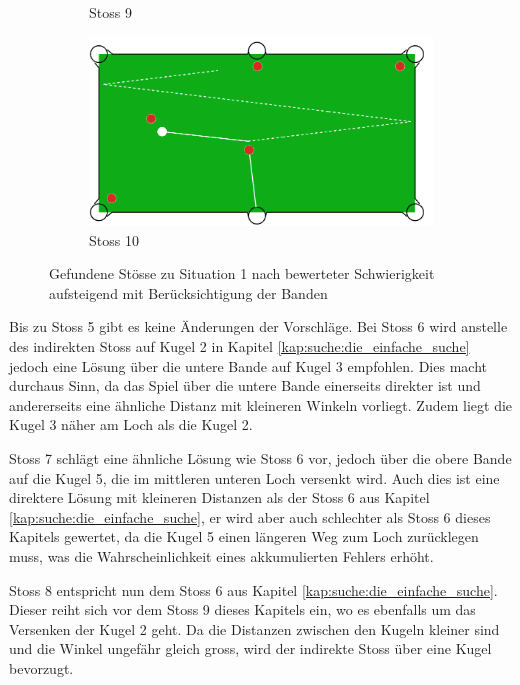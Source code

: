 \begin{figure}[h!]
\begin{subfigure}[b]{0.3\textwidth}
        \caption{Stoss 9}
        \label{fig:situation_rail_1_solution_9}
    \end{subfigure}
    \hfill
    \begin{subfigure}[b]{0.3\textwidth}
        \centering
        \includegraphics[width=1.0\linewidth]{../common/04_results/resources/simple_search/situation_diverse_solution_rail_10.PNG}
        \caption{Stoss 10}
        \label{fig:situation_rail_1_solution_10}
    \end{subfigure}
    \caption{Gefundene Stösse zu Situation 1 nach bewerteter Schwierigkeit aufsteigend mit Berücksichtigung der Banden}
    \label{fig:situation_1_solutions_bande}
\end{figure}

Bis zu Stoss 5 gibt es keine Änderungen der Vorschläge. Bei Stoss 6 wird
anstelle des indirekten Stoss auf Kugel 2 in Kapitel \ref{kap:suche:die_einfache_suche} jedoch eine Lösung über
die untere Bande auf Kugel 3 empfohlen. Dies macht durchaus Sinn, da das Spiel über
die untere Bande einerseits direkter ist und andererseits eine ähnliche Distanz
mit kleineren Winkeln vorliegt. Zudem liegt die Kugel 3 näher am Loch als die Kugel 2.

Stoss 7 schlägt eine ähnliche Lösung wie Stoss 6 vor, jedoch über die obere Bande auf die Kugel 5, die im
mittleren unteren Loch versenkt wird. Auch dies ist eine direktere Lösung mit kleineren Distanzen
als der Stoss 6 aus Kapitel \ref{kap:suche:die_einfache_suche}, er wird aber auch schlechter als Stoss 6 dieses Kapitels
gewertet, da die Kugel 5 einen längeren Weg zum Loch zurücklegen muss, was die Wahrscheinlichkeit
eines akkumulierten Fehlers erhöht.

Stoss 8 entspricht nun dem Stoss 6 aus Kapitel \ref{kap:suche:die_einfache_suche}. Dieser reiht sich vor
dem Stoss 9 dieses Kapitels ein, wo es ebenfalls um das Versenken der Kugel 2 geht. Da die Distanzen
zwischen den Kugeln kleiner sind und die Winkel ungefähr gleich gross, wird der indirekte Stoss
über eine Kugel bevorzugt.

